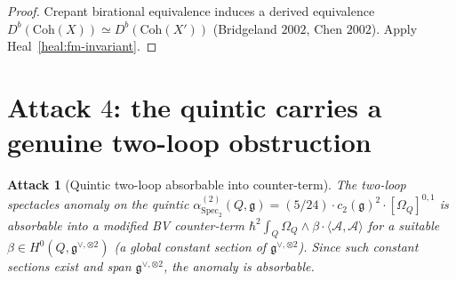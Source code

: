 \documentclass[11pt]{article}
\newtheorem{attack}[theorem]{Attack}
\providecommand{\Coh}{\mathrm{Coh}}
\providecommand{\Om}{\Omega}
\providecommand{\cA}{\mathcal{A}}
\providecommand{\fg}{\mathfrak{g}}
\begin{document}
\begin{proof}
Crepant birational equivalence induces a derived equivalence
$D^b(\Coh(X)) \simeq D^b(\Coh(X'))$ (Bridgeland $2002$, Chen $2002$).
Apply Heal~\ref{heal:fm-invariant}.
\end{proof}

\section{Attack $4$:  the quintic carries a genuine two-loop
obstruction}
\label{sec:attack-4-quintic}

\begin{attack}[Quintic two-loop absorbable into counter-term]
\label{att:quintic-absorbable}
The two-loop spectacles anomaly on the quintic
$\alpha^{(2)}_{\mathrm{Spec}_2}(Q, \fg) = (5/24) \cdot c_2(\fg)^2 \cdot
[\Om_Q]^{0,1}$ is absorbable into a modified BV counter-term
$\hbar^2 \int_Q \Om_Q \wedge \beta \cdot \langle \cA, \cA\rangle$
for a suitable $\beta \in H^0(Q, \fg^{\vee,\otimes 2})$ (a global
constant section of $\fg^{\vee,\otimes 2}$).  Since such constant
sections exist and span $\fg^{\vee,\otimes 2}$, the anomaly is
absorbable.
\end{attack}
\end{document}
